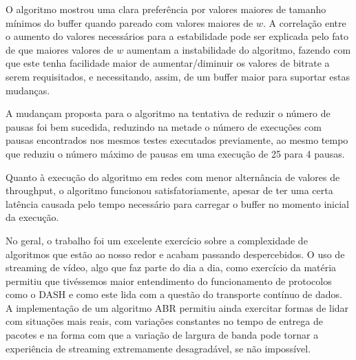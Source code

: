 \documentclass[10pt,twocolumn,letterpaper]{article}
\begin{document}
	O algoritmo mostrou uma clara preferência por valores maiores de tamanho mínimos do buffer quando pareado com valores maiores de $w$. A correlação entre o aumento do valores necessários para a estabilidade pode ser explicada pelo fato de que maiores valores de $w$ aumentam a instabilidade do algoritmo, fazendo com que este tenha facilidade maior de aumentar/diminuir os valores de bitrate a serem requisitados, e necessitando, assim, de um buffer maior para suportar estas mudanças. 
	
	A mudançam proposta para o algoritmo na tentativa de reduzir o número de pausas foi bem sucedida, reduzindo na metade o número de execuções com pausas encontrados nos mesmos testes executados previamente, ao mesmo tempo que reduziu o número máximo de pausas em uma execução de 25 para 4 pausas. 
	
	Quanto à execução do algoritmo em redes com menor alternância de valores de throughput, o algoritmo funcionou satisfatoriamente, apesar de ter uma certa latência causada pelo tempo necessário para carregar o buffer no momento inicial da execução. 
	
	No geral, o trabalho foi um excelente exercício sobre a complexidade de algoritmos que estão ao nosso redor e acabam passando despercebidos. O uso de streaming de vídeo, algo que faz parte do dia a dia, como exercício da matéria permitiu que tivéssemos maior entendimento do funcionamento de protocolos como o DASH e como este lida com a questão do transporte contínuo de dados. A implementação de um algoritmo ABR permitiu ainda exercitar formas de lidar com situações mais reais, com variações constantes no tempo de entrega de pacotes e na forma com que a variação de largura de banda pode tornar a experiência de streaming extremamente desagradável, se não impossível.
	
	{\small
		
		
	}
	
\end{document}
